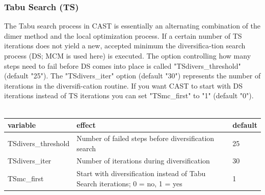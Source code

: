 \documentclass[10pt,a4paper]{article} %
\begin{document}
{	%
	\subsubsection{Tabu Search (TS)}
	The Tabu search process in CAST is essentially an alternating combination of the dimer method and the local optimization process.
	If a certain number of TS iterations does not yield a new, accepted minimum the diversifica-tion search process (DS; MCM is used here) is executed. The option controlling how many steps need to fail before DS comes into place is called "TSdivers_threshold" (default "25").
	The "TSdivers_iter" option (default "30") represents the number of iterations in the diversifi-cation routine.
	If you want CAST to start with DS iterations instead of TS iterations you can set "TSmc_first" to "1" (default "0").\\~\\

	\begin{tabularx}{\textwidth}{l|X|X}
		variable & effect & default \\
		\hline
		TSdivers_threshold & Number of failed steps before diversification search & 25 \\
		TSdivers_iter & Number of iterations during diversification & 30 \\
		TSmc_first & Start with diversification instead of Tabu Search iterations; 0 = no, 1 = yes & 1 \\
	\end{tabularx}
	\\~\\

}
\end{document}
